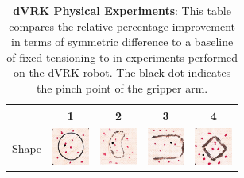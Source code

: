 \begin{table}[t!]
\centering
\vspace{5pt}
\caption{\textbf{dVRK Physical Experiments}: This table compares the relative percentage improvement in terms of symmetric difference to a baseline of fixed tensioning to \tpsalgo in experiments performed on the dVRK robot. The black dot indicates the pinch point of the gripper arm.}
\begin{tabular}{m{10mm}cccc}
\hline
&  1 & 2 & 3 & 4 \\
\midrule
\cellcolor[HTML]{CBCEFB} Shape \vspace{10pt} & \includegraphics[height=1.2cm]{tps-experiments/shapes-robot/1-dot.jpg} & \includegraphics[height=1.2cm]{tps-experiments/shapes-robot/2-dot.jpg} &   \includegraphics[height=1.2cm]{tps-experiments/shapes-robot/3-dot.jpg} & \includegraphics[height=1.2cm]{tps-experiments/shapes-robot/4-dot.jpg} \\

\end{tabular}
\end{table}
